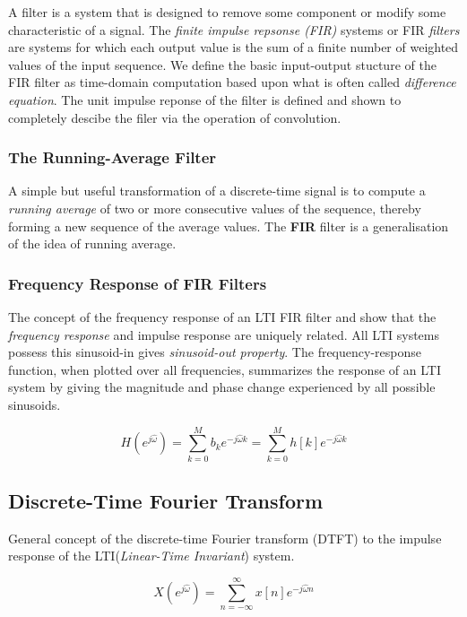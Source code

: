 \documentclass[11pt]{article}
\begin{document}
A filter is a system that is designed to remove some component or modify some
characteristic of a signal. The \emph{finite impulse repsonse (FIR)} systems or
FIR \emph{filters} are systems for which each output value is the sum of a
finite number of weighted values of the input sequence. We define the basic
input-output stucture of the FIR filter as time-domain computation based upon
what is often called \emph{difference equation}. The unit impulse reponse of the
filter is defined and shown to completely descibe the filer via the operation
of convolution.

\subsubsection{The Running-Average Filter}

A simple but useful transformation of a discrete-time signal is to compute a
\emph{running average} of two or more consecutive values of the sequence,
thereby forming a new sequence of the average values. The \textbf{FIR} filter is
a generalisation of the idea of running average.

\subsubsection{Frequency Response of FIR Filters}

The concept of the frequency response of an LTI FIR filter and show that the
\emph{frequency response} and impulse response are uniquely related. All LTI
systems possess this sinusoid-in gives \emph{sinusoid-out property}. The
frequency-response function, when plotted over all frequencies, summarizes the
response of an LTI system by giving the magnitude and phase change experienced
by all possible sinusoids.

\begin{equation}
  H(e^{j\hat{\omega}}) = \sum_{k = 0}^{M} b_k e^{-j \hat{\omega} k}
                       = \sum_{k = 0}^{M} h[k] e^{-j \hat{\omega} k}
\end{equation}

\subsection{Discrete-Time Fourier Transform}

General concept of the discrete-time Fourier transform (DTFT) to the impulse
response of the LTI(\emph{Linear-Time Invariant}) system.

\begin{equation}
  X(e^{j\hat{\omega}}) = \sum_{n = -\infty}^{\infty} x[n]e^{-j\hat{\omega}n}
\end{equation}
\end{document}
